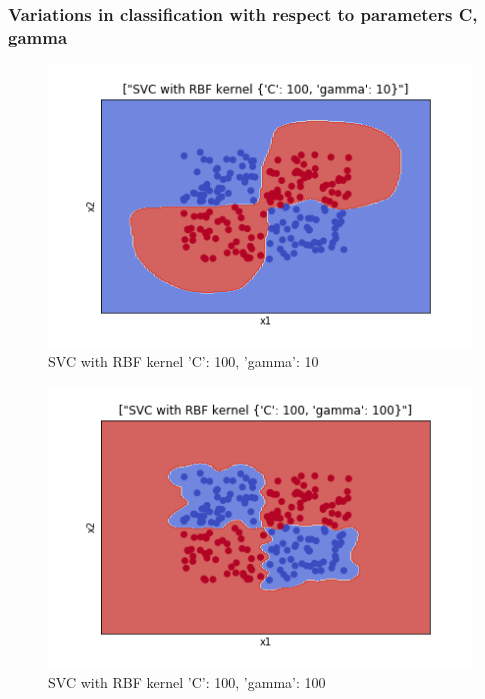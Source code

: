 \documentclass[10pt,a4paper]{article}
\begin{document}
\subsubsection*{Variations in classification with respect to parameters C, gamma}
\graphicspath{ {/images/} }
\begin{figure}[!h]
\includegraphics[scale=0.75]{images/P2/RBFg10c100.png}
  \caption{SVC with RBF kernel {'C': 100, 'gamma': 10}}
  \label{fig:rbf_kerE2}
\end{figure}

\begin{figure}[!h]
\includegraphics[scale=0.75]{images/P2/RBFg100c100.png}
  \caption{SVC with RBF kernel {'C': 100, 'gamma': 100}}
  \label{fig:rbf_kerE3}
\end{figure}

\vfill
\clearpage
\end{document}
